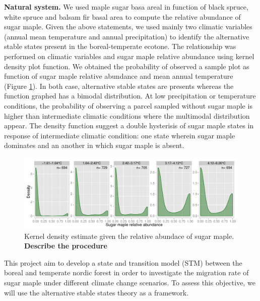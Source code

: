 \textbf{Natural system.} We used maple sugar basa areal in function of black spruce, white spruce and balsam fir basal area to compute the relative abundance of sugar maple. Given the above statements, we used mainly two climatic variables (annual mean temperature and annual precipitation) to identify the alternative stable states present in the boreal-temperate ecotone. The relationship was performed on climatic variables and sugar maple relative abundance using kernel density plot function. We obtained the probability of observed a sample plot as function of sugar maple relative abundance and mean annual temperature (Figure \ref{fig1}). In both case, alternative stable states are presents whereas the function graphed has a bimodal distribution. At low precipitation or temperature conditions, the probability of observing a parcel sampled without sugar maple is higher than intermediate climatic conditions where the multimodal distribution appear. The density function suggest a double hysterisis of sugar maple states in response of intermediate climatic condition: one state wherein sugar maple dominates and an another in which sugar maple is absent. \\


\begin{figure}[ht]
	\begin{center}
	\includegraphics[width=\textwidth]{fig/window_temp.pdf}
	\end{center}
	\caption{Kernel density estimate given the relative abundace of sugar maple. \textbf{Describe the procedure}}
	\label{fig1}
\end{figure}

This project aim to develop a state and transition model (STM) between the boreal and temperate nordic forest in order to investigate the migration rate of sugar maple under different climate change scenarios. To assess this objective, we will use the alternative stable states theory as a framework.



